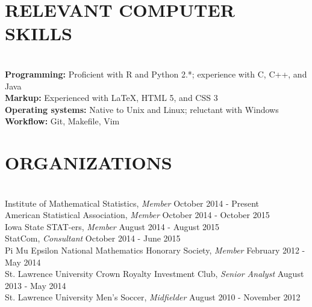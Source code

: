 \documentclass{res} %
\begin{document}
\begin{resume}

\section{RELEVANT COMPUTER SKILLS}

\hrulefill \\
{\bf Programming:} Proficient with R and Python 2.*; experience with C, C++, and Java \\
{\bf Markup:} Experienced with \LaTeX, HTML 5, and CSS 3 \\
{\bf Operating systems:} Native to Unix and Linux; reluctant with Windows \\
{\bf Workflow:} Git, Makefile, Vim


\section{ORGANIZATIONS}

\hrulefill \\
Institute of Mathematical Statistics, {\sl Member} \dotfill October 2014 - Present \\
American Statistical Association, {\sl Member} \dotfill October 2014 - October 2015 \\
Iowa State STAT-ers, {\sl Member} \dotfill August 2014 - August 2015 \\
StatCom, {\sl Consultant} \dotfill October 2014 - June 2015\\
Pi Mu Epsilon National Mathematics Honorary Society, {\sl Member} \dotfill February 2012 - May 2014 \\
St. Lawrence University Crown Royalty Investment Club, {\sl Senior Analyst} \dotfill August 2013 - May 2014 \\
St. Lawrence University Men's Soccer, {\sl Midfielder} \dotfill August 2010 - November 2012 



\end{resume}
\end{document}
